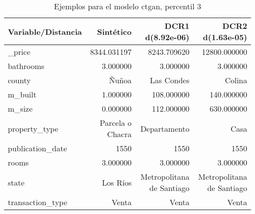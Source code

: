 \begin{table}[H]
\centering
\fontsize{10}{14}\selectfont
\caption{Ejemplos para el modelo ctgan, percentil 3}
\label{table-example-economicos-a-2-ctgan-3p}
\begin{tabular}{|l|r|r|r|}
\hline
\rowcolor[gray]{0.8}
Variable/Distancia & Sintético & DCR1 d(8.92e-06) & DCR2 d(1.63e-05) \\
\hline \_price & \cellcolor[rgb]{0.9, 0.54, 0.52} 8344.031197 & 8243.709620 & 12800.000000 \\
\hline bathrooms & \cellcolor[rgb]{0.9, 0.54, 0.52} 3.000000 & \cellcolor[rgb]{0.9, 0.54, 0.52} 3.000000 & \cellcolor[rgb]{0.9, 0.54, 0.52} 3.000000 \\
\hline county & \cellcolor[rgb]{0.9, 0.54, 0.52} Ñuñoa & Las Condes & Colina \\
\hline m\_built & \cellcolor[rgb]{0.9, 0.54, 0.52} 1.000000 & 108.000000 & 140.000000 \\
\hline m\_size & \cellcolor[rgb]{0.9, 0.54, 0.52} 0.000000 & 112.000000 & 630.000000 \\
\hline property\_type & \cellcolor[rgb]{0.9, 0.54, 0.52} Parcela o Chacra & Departamento & Casa \\
\hline publication\_date & \cellcolor[rgb]{0.9, 0.54, 0.52} 1550 & \cellcolor[rgb]{0.9, 0.54, 0.52} 1550 & \cellcolor[rgb]{0.9, 0.54, 0.52} 1550 \\
\hline rooms & \cellcolor[rgb]{0.9, 0.54, 0.52} 3.000000 & \cellcolor[rgb]{0.9, 0.54, 0.52} 3.000000 & \cellcolor[rgb]{0.9, 0.54, 0.52} 3.000000 \\
\hline state & \cellcolor[rgb]{0.9, 0.54, 0.52} Los Ríos & Metropolitana de Santiago & Metropolitana de Santiago \\
\hline transaction\_type & \cellcolor[rgb]{0.9, 0.54, 0.52} Venta & \cellcolor[rgb]{0.9, 0.54, 0.52} Venta & \cellcolor[rgb]{0.9, 0.54, 0.52} Venta \\
\hline
\end{tabular}
\end{table}
